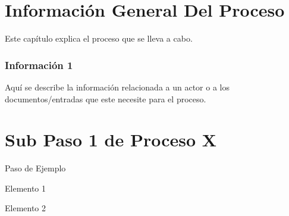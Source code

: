 \documentclass[oneside,10pt]{book}
\begin{document}
\chapter{Información General Del Proceso}
Este capítulo explica el proceso que se lleva a cabo.
\subsection{Información 1}
Aquí se describe la información relacionada a un actor o a los documentos/entradas que este necesite para el proceso.
\chapter{Sub Paso 1 de Proceso X}
\begin{UMStep}{Paso de Ejemplo}
	\item Elemento 1
	\item Elemento 2
\end{UMStep}
\end{document}
